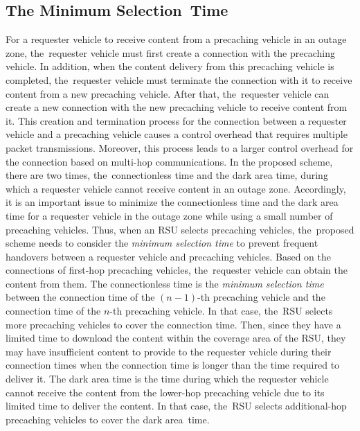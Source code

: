 \documentclass[electronics,aricle,accept,pdftex,moreauthors]{Definitions/mdpi}
\begin{document}
\subsection{The Minimum Selection~Time} \label{sec3.2}
For a requester vehicle to receive content from a precaching vehicle in an outage zone, the~requester vehicle must first create a connection with the precaching vehicle.
In addition, when the content delivery from this precaching vehicle is completed, the~requester vehicle must terminate the connection with it to receive content from a new precaching vehicle.
After that, the~requester vehicle can create a new connection with the new precaching vehicle to receive content from it.
This creation and termination process for the connection between a requester vehicle and a precaching vehicle causes a control overhead that requires multiple packet transmissions.
Moreover, this process leads to a larger control overhead for the connection based on multi-hop communications.
In the proposed scheme, there are two times, the~connectionless time and the dark area time, during which a requester vehicle cannot receive content in an outage zone.
Accordingly, it is an important issue to minimize the connectionless time and the dark area time for a requester vehicle in the outage zone while using a small number of precaching vehicles.
Thus, when an RSU selects precaching vehicles, the~proposed scheme needs to consider the \textit{minimum selection time} to prevent frequent handovers between a requester vehicle and precaching vehicles.
Based on the connections of first-hop precaching vehicles, the~requester vehicle can obtain the content from them.
The connectionless time is the \textit{minimum selection time} between the connection time of the $(n-1)$-th precaching vehicle and the connection time of the $n$-th precaching vehicle.
In that case, the~RSU selects more precaching vehicles to cover the connection time.
Then, since they have a limited time to download the content within the coverage area of the RSU, they may have insufficient content to provide to the requester vehicle during their connection times when the connection time is longer than the time required to deliver it.
The dark area time is the time during which the requester vehicle cannot receive the content from the lower-hop precaching vehicle due to its limited time to deliver the content.
In that case, the~RSU selects additional-hop precaching vehicles to cover the dark area~time. 
\end{document}
